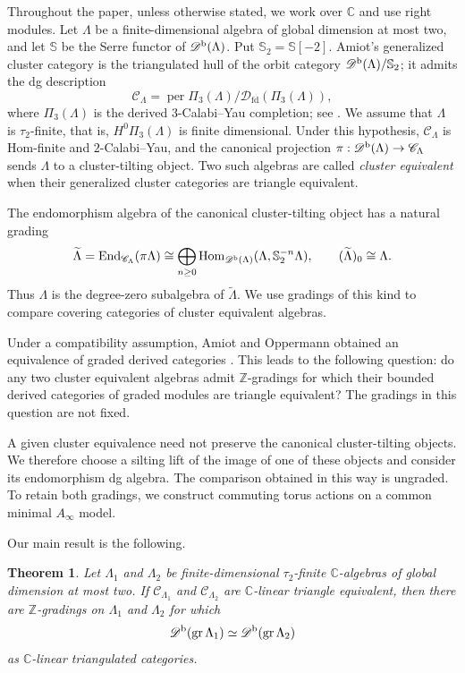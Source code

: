 \documentclass[12pt,a4paper,english,reqno]{amsart}
\theoremstyle{plain}
\newtheorem{thm}{Theorem}[section]
\theoremstyle{definition}
\numberwithin{equation}{section}
\def\ta{\tau}
\def\La{\Lambda}
\def\Hom{\operatorname{Hom}}
\def\End{\operatorname{End}}
\def\Db{{\mathcal D}^{\text{\rm b}}}
\def\perf{\operatorname{per}}
\def\calC{{\mathcal C}}
\def\calD{{\mathcal D}}
\def\bbZ{{\mathbb Z}}
\def\bbC{{\mathbb C}}
\def\iso{\cong}
\def\Ds{\bigoplus}
\def\gr{\operatorname{gr}}
\def\Ainf{A_\infty}
\def\fd{\mathrm{fd}}
\begin{document}
Throughout the paper, unless otherwise stated, we work over $\bbC$ and use right modules. Let $\La$ be a finite-dimensional algebra of global dimension at most two, and let $\mathbb S$ be the Serre functor of $\Db(\La)$. Put $\mathbb S_2=\mathbb S[-2]$. Amiot's generalized cluster category is the triangulated hull of the orbit category $\Db(\La)/\mathbb S_2$; it admits the dg description
\[
 \calC_\La
 =\perf\Pi_3(\La)/\calD_{\fd}(\Pi_3(\La)),
\]
where $\Pi_3(\La)$ is the derived $3$-Calabi--Yau completion; see \cite{Amiot,Keller}. We assume that $\La$ is $\ta_2$-finite, that is, $H^0\Pi_3(\La)$ is finite dimensional. Under this hypothesis, $\calC_\La$ is Hom-finite and $2$-Calabi--Yau, and the canonical projection $\pi:\Db(\La)\to\calC_\La$ sends $\La$ to a cluster-tilting object. Two such algebras are called \emph{cluster equivalent} when their generalized cluster categories are triangle equivalent.

The endomorphism algebra of the canonical cluster-tilting object has a natural grading
\[
 \widetilde\La
 =\End_{\calC_\La}(\pi\La)
 \iso\Ds_{n\geq0}
       \Hom_{\Db(\La)}(\La,\mathbb S_2^{-n}\La),
 \qquad (\widetilde\La)_0\iso\La.
\]
Thus $\La$ is the degree-zero subalgebra of $\widetilde\La$. We use gradings of this kind to compare covering categories of cluster equivalent algebras.

Under a compatibility assumption, Amiot and Oppermann obtained an equivalence of graded derived categories \cite[Theorem~8.7]{AO}. This leads to the following question: do any two cluster equivalent algebras admit $\bbZ$-gradings for which their bounded derived categories of graded modules are triangle equivalent? The gradings in this question are not fixed.

A given cluster equivalence need not preserve the canonical cluster-tilting objects. We therefore choose a silting lift of the image of one of these objects and consider its endomorphism dg algebra. The comparison obtained in this way is ungraded. To retain both gradings, we construct commuting torus actions on a common minimal $\Ainf$ model.

Our main result is the following.

\begin{thm}\label{thm:main}
Let $\La_1$ and $\La_2$ be finite-dimensional $\ta_2$-finite $\bbC$-algebras of global dimension at most two. If $\calC_{\La_1}$ and $\calC_{\La_2}$ are $\bbC$-linear triangle equivalent, then there are $\bbZ$-gradings on $\La_1$ and $\La_2$ for which
\[
 \Db(\gr\La_1)\simeq\Db(\gr\La_2)
\]
as $\bbC$-linear triangulated categories.
\end{thm}
\end{document}
